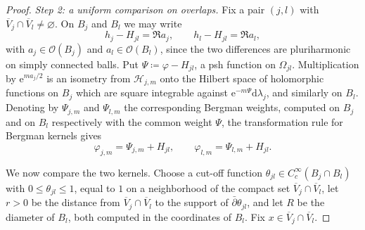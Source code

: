 \begin{proof}
\emph{Step 2: a uniform comparison on overlaps.}
Fix a pair $(j,l)$ with $\overline V_j\cap\overline V_l\ne\varnothing$.
On $B_j$ and $B_l$ we may write
\[
  h_j-H_{jl}=\Re a_j,\qquad h_l-H_{jl}=\Re a_l,
\]
with $a_j\in\mathcal O(B_j)$ and $a_l\in\mathcal O(B_l)$, since the two differences
are pluriharmonic on simply connected balls. Put $\Psi\coloneqq \varphi-H_{jl}$,
a psh function on $\Omega_{jl}$. Multiplication by $\mathrm{e}^{ma_j/2}$ is an
isometry from $\mathcal H_{j,m}$ onto the Hilbert space of holomorphic
functions on $B_j$ which are square integrable against
$\mathrm{e}^{-m\Psi}\mathrm{d}\lambda_j$, and similarly on $B_l$. Denoting by $\Psi_{j,m}$ and
$\Psi_{l,m}$ the corresponding Bergman weights, computed on $B_j$ and
on $B_l$ respectively with the common weight $\Psi$, the transformation
rule for Bergman kernels gives
\[
  \varphi_{j,m}=\Psi_{j,m}+H_{jl},\qquad
  \varphi_{l,m}=\Psi_{l,m}+H_{jl}.
\]
 
We now compare the two kernels. Choose a cut-off function
$\theta_{jl}\in C^\infty_c(B_j\cap B_l)$ with
$0\le\theta_{jl}\le1$, equal to $1$ on a
neighborhood of the compact set $\overline V_j\cap\overline V_l$, let
$r>0$ be the distance from $\overline V_j\cap\overline V_l$ to the
support of $\bar\partial\theta_{jl}$, and let $R$ be the diameter of
$B_l$, both computed in the coordinates of $B_l$. Fix
$x\in\overline V_j\cap\overline V_l$.
 

\end{proof}

